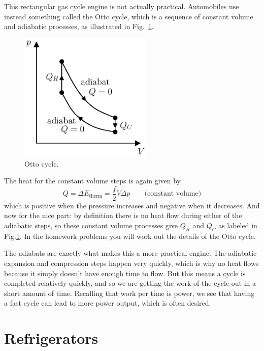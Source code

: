 This rectangular gas cycle engine is not actually practical.  Automobiles
use instead something called the Otto cycle, which is a sequence of
constant volume and adiabatic processes, as illustrated in
Fig.~\ref{fig:otto_cycle}.

\begin{figure}
\begin{center}
\includegraphics[width=2.5in]{heat_engines/otto_cycle.eps}
\caption{Otto cycle.}
\label{fig:otto_cycle}
\end{center}
\end{figure}

The heat for the constant volume steps is again given by
\begin{equation}
Q = \Delta E_\text{therm} = \frac{f}{2}V\Delta p \qquad\text{(constant
  volume)}
\end{equation}
which is positive when the pressure increases and negative when it
decreases.  And now for the nice part: by definition there is no heat flow during
either of the adiabatic steps, so these constant volume processes give
$Q_H$ and $Q_C$ as labeled in Fig.\ref{fig:otto_cycle}.  In the
homework problems you will work out the details of the Otto cycle.

The adiabats are exactly what makes this a more practical engine.
The adiabatic expansion and compression steps happen very quickly,
which is why no heat flows because it simply doesn't have enough time
to flow.  But this means a cycle is completed relatively quickly, and
so we are getting the work of the cycle out in a short amount of
time.  Recalling that work per time is power, we see that having a
fast cycle can lead to more power output, which is often desired.

\section{Refrigerators}

